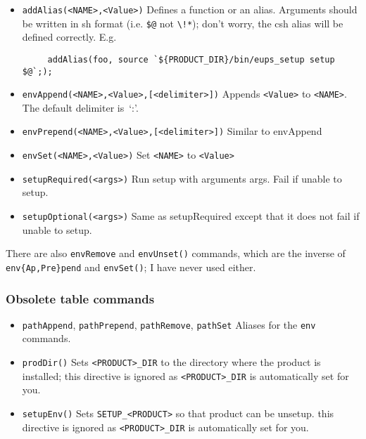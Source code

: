 \documentclass{article}
\newcommand{\code}[1]{\texttt{#1}}
\begin{document}
\begin{itemize}
   \item \code{addAlias(<NAME>,<Value>)}
     Defines a function or an alias.  Arguments should be written in
     sh format (i.e. \code{\$@} not \code{\textbackslash!*}); don't worry,
     the csh alias will be defined correctly.  E.g.
     \begin{verbatim}
     addAlias(foo, source `${PRODUCT_DIR}/bin/eups_setup setup $@`;);
     \end{verbatim}
    
   \item \code{envAppend(<NAME>,<Value>,[<delimiter>])}
     Appends \code{<Value>} to \code{<NAME>}. The default delimiter is~`:'.
     
   \item \code{envPrepend(<NAME>,<Value>,[<delimiter>])}
     Similar to envAppend
     
   \item \code{envSet(<NAME>,<Value>)}
     Set \code{<NAME>} to \code{<Value>}
     
   \item \code{setupRequired(<args>)}
     Run setup with arguments args. Fail if unable to setup.
     
   \item \code{setupOptional(<args>)}
     Same as setupRequired except that it does not fail if unable to setup.
\end{itemize}

There are also \code{envRemove} and \code{envUnset()} commands, which
are the inverse of \code{env\{Ap,Pre\}pend} and \code{envSet()}; I have
never used either.     

\subsubsection{Obsolete table commands}

\begin{itemize}
   \item \code{pathAppend}, \code{pathPrepend}, \code{pathRemove}, \code{pathSet}
     Aliases for the \code{env} commands.
     
   \item \code{prodDir()}
     Sets \code{<PRODUCT>\_DIR} to the directory where the product is installed;
     this directive is ignored as \code{<PRODUCT>\_DIR} is automatically set for you.
     
   \item \code{setupEnv()}
     Sets \code{SETUP\_<PRODUCT>} so that product can be unsetup.
     this directive is ignored as \code{<PRODUCT>\_DIR} is automatically set for you.
\end{itemize}
        
\end{document}

